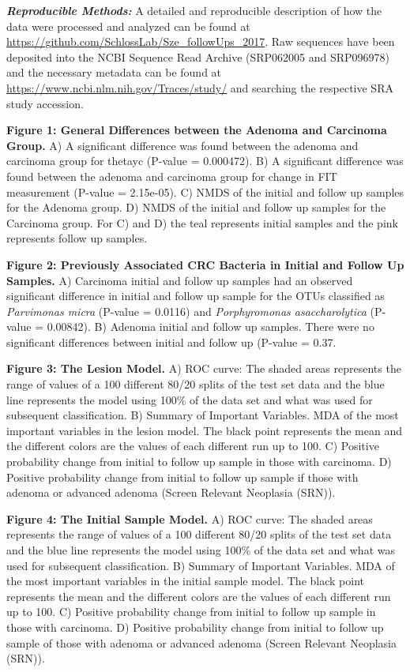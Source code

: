 \documentclass[12pt,]{article}
\begin{document}
\textbf{\emph{Reproducible Methods:}} A detailed and reproducible
description of how the data were processed and analyzed can be found at
\url{https://github.com/SchlossLab/Sze_followUps_2017}. Raw sequences
have been deposited into the NCBI Sequence Read Archive (SRP062005 and
SRP096978) and the necessary metadata can be found at
\url{https://www.ncbi.nlm.nih.gov/Traces/study/} and searching the
respective SRA study accession.

\newpage

\textbf{Figure 1: General Differences between the Adenoma and Carcinoma
Group.} A) A significant difference was found between the adenoma and
carcinoma group for thetayc (P-value = 0.000472). B) A significant
difference was found between the adenoma and carcinoma group for change
in FIT measurement (P-value = 2.15e-05). C) NMDS of the initial and
follow up samples for the Adenoma group. D) NMDS of the initial and
follow up samples for the Carcinoma group. For C) and D) the teal
represents initial samples and the pink represents follow up samples.

\textbf{Figure 2: Previously Associated CRC Bacteria in Initial and
Follow Up Samples.} A) Carcinoma initial and follow up samples had an
observed significant difference in initial and follow up sample for the
OTUs classified as \emph{Parvimonas micra} (P-value = 0.0116) and
\emph{Porphyromonas asaccharolytica} (P-value = 0.00842). B) Adenoma
initial and follow up samples. There were no significant differences
between initial and follow up (P-value = 0.37.

\textbf{Figure 3: The Lesion Model.} A) ROC curve: The shaded areas
represents the range of values of a 100 different 80/20 splits of the
test set data and the blue line represents the model using 100\% of the
data set and what was used for subsequent classification. B) Summary of
Important Variables. MDA of the most important variables in the lesion
model. The black point represents the mean and the different colors are
the values of each different run up to 100. C) Positive probability
change from initial to follow up sample in those with carcinoma. D)
Positive probability change from initial to follow up sample if those
with adenoma or advanced adenoma (Screen Relevant Neoplasia (SRN)).

\textbf{Figure 4: The Initial Sample Model.} A) ROC curve: The shaded
areas represents the range of values of a 100 different 80/20 splits of
the test set data and the blue line represents the model using 100\% of
the data set and what was used for subsequent classification. B) Summary
of Important Variables. MDA of the most important variables in the
initial sample model. The black point represents the mean and the
different colors are the values of each different run up to 100. C)
Positive probability change from initial to follow up sample in those
with carcinoma. D) Positive probability change from initial to follow up
sample of those with adenoma or advanced adenoma (Screen Relevant
Neoplasia (SRN)).
\end{document}
